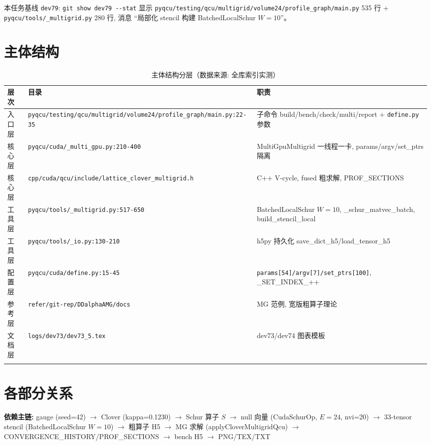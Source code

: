 \documentclass[UTF8]{ctexart}
\begin{document}
\noindent 本任务基线 \texttt{\nolinkurl{dev79}}: \texttt{\nolinkurl{git show dev79 --stat}} 显示 \texttt{\nolinkurl{pyqcu/testing/qcu/multigrid/volume24/profile_graph/main.py}} 535 行 + \texttt{\nolinkurl{pyqcu/tools/_multigrid.py}} 280 行, 消息 ``局部化 stencil 构建 BatchedLocalSchur $W=10$''。

\section{主体结构}
\begin{xltabular}{\textwidth}{llX}
\toprule
\textcolor{struct}{层次} & 目录 & \textcolor{struct}{职责} \\
\midrule
\endhead
入口层 & \texttt{\nolinkurl{pyqcu/testing/qcu/multigrid/volume24/profile_graph/main.py:22-35}} & 子命令 build/bench/check/multi/report + \texttt{\nolinkurl{define.py}} 参数 \\
核心层 & \texttt{\nolinkurl{pyqcu/cuda/_multi_gpu.py:210-400}} & MultiGpuMultigrid 一线程一卡, params/argv/set\_ptrs 隔离 \\
核心层 & \texttt{\nolinkurl{cpp/cuda/qcu/include/lattice_clover_multigrid.h}} & C++ V-cycle, fused 粗求解, PROF\_SECTIONS \\
工具层 & \texttt{\nolinkurl{pyqcu/tools/_multigrid.py:517-650}} & BatchedLocalSchur $W=10$, \_schur\_matvec\_batch, build\_stencil\_local \\
工具层 & \texttt{\nolinkurl{pyqcu/tools/_io.py:130-210}} & h5py 持久化 save\_dict\_h5/load\_tensor\_h5 \\
配置层 & \texttt{\nolinkurl{pyqcu/cuda/define.py:15-45}} & \texttt{\nolinkurl{params[54]/argv[7]/set_ptrs[100]}}, \_SET\_INDEX\_++ \\
参考层 & \texttt{\nolinkurl{refer/git-rep/DDalphaAMG/docs}} & MG 范例, 宽版粗算子理论 \\
文档层 & \texttt{\nolinkurl{logs/dev73/dev73_5.tex}} & dev73/dev74 图表模板 \\
\bottomrule
\caption{主体结构分层（数据来源: 全库索引实测）}
\end{xltabular}

\section{各部分关系}
\begin{keybox}
\textbf{依赖主链:} \textcolor{relation}{gauge (seed=42) $\to$ Clover (kappa=0.1230) $\to$ Schur 算子 $S$ $\to$ null 向量 (CudaSchurOp, $E=24$, nvi=20) $\to$ 33-tensor stencil (BatchedLocalSchur $W=10$) $\to$ 粗算子 H5 $\to$ MG 求解 (applyCloverMultigridQcu) $\to$ CONVERGENCE\_HISTORY/PROF\_SECTIONS $\to$ bench H5 $\to$ PNG/TEX/TXT}
\end{keybox}
\end{document}
